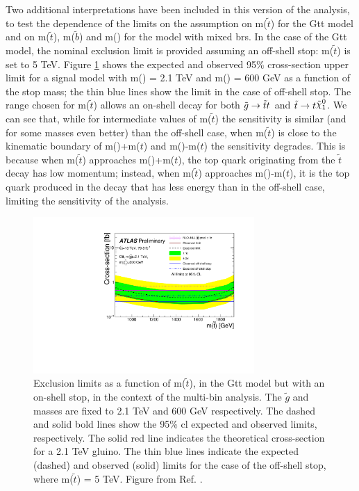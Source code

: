 Two additional interpretations have been included in this version of the analysis, to test the dependence of the limits on the 
assumption on m($\tilde{t}$) for the Gtt model and on m($\tilde{t}$), m($\tilde{b}$) and m(\chinoonepm) for the model with mixed \glspl{br}.
In the case of the Gtt model, the nominal exclusion limit is provided assuming an off-shell stop: m($\tilde{t}$) is set to 5 TeV.
Figure \ref{fig:limits_GttOnshell} shows the expected and observed 95\% cross-section upper limit for a signal model with 
m(\gluino) = 2.1 TeV and m(\ninoone) = 600 GeV as a function of the stop mass; the thin blue lines 
show the limit in the case of off-shell stop. 
The range chosen for  m($\tilde{t}$) allows an on-shell decay for both 
$\tilde{g} \to \tilde{t}t$ and $\tilde{t} \to t \ninoone$. 
We can see that, while for intermediate values of m($\tilde{t}$) the sensitivity is similar (and for some masses even better) 
than the off-shell case, when m($\tilde{t}$) is close to the kinematic boundary of 
m(\ninoone)+m($t$) and m(\gluino)-m($t$) the sensitivity degrades. 
This is because when m($\tilde{t}$) approaches m(\ninoone)+m($t$), the top quark originating from the $\tilde{t}$ decay 
has low momentum; instead, when m($\tilde{t}$) approaches m(\gluino)-m($t$), it is the top quark produced in the \gluino 
decay that has less energy than in the off-shell case, limiting the sensitivity of the analysis. 

\begin{figure}
  \centering
  \includegraphics[width=0.75\textwidth]{figures/Chap8/Rizzi-Fig8-48.pdf}
  \caption{Exclusion limits as a function of m($\tilde{t}$), in the Gtt model but with an on-shell stop, in the context of the multi-bin analysis. The $\tilde{g}$ and \ninoone masses are fixed to 2.1 TeV and 600 GeV respectively. The dashed and solid bold lines
    show the 95\% \gls{cl} expected and observed limits, respectively. The solid red line indicates the theoretical cross-section for a 2.1 TeV gluino. The thin blue lines indicate the expected (dashed) and observed (solid) limits for the case of the off-shell stop, where m($\tilde{t}$) = 5 TeV.
    Figure from Ref. \cite{ATLAS-CONF-2018-041}.}
  \label{fig:limits_GttOnshell}
\end{figure}


